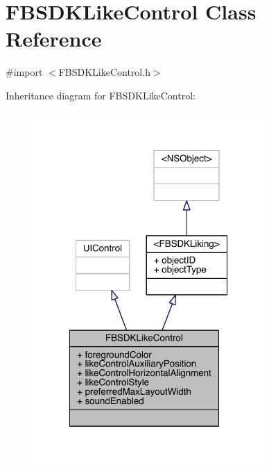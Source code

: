 \hypertarget{interface_f_b_s_d_k_like_control}{\section{F\-B\-S\-D\-K\-Like\-Control Class Reference}
\label{interface_f_b_s_d_k_like_control}
}


{\ttfamily \#import $<$F\-B\-S\-D\-K\-Like\-Control.\-h$>$}



Inheritance diagram for F\-B\-S\-D\-K\-Like\-Control\-:
\nopagebreak
\begin{figure}[H]
\begin{center}
\leavevmode
\includegraphics[width=249pt]{interface_f_b_s_d_k_like_control__inherit__graph}
\end{center}
\end{figure}


